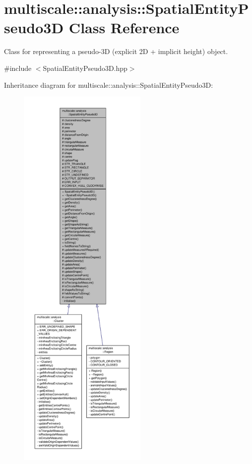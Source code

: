 \hypertarget{classmultiscale_1_1analysis_1_1SpatialEntityPseudo3D}{\section{multiscale\-:\-:analysis\-:\-:Spatial\-Entity\-Pseudo3\-D Class Reference}
\label{classmultiscale_1_1analysis_1_1SpatialEntityPseudo3D}
}


Class for representing a pseudo-\/3\-D (explicit 2\-D + implicit height) object.  




{\ttfamily \#include $<$Spatial\-Entity\-Pseudo3\-D.\-hpp$>$}



Inheritance diagram for multiscale\-:\-:analysis\-:\-:Spatial\-Entity\-Pseudo3\-D\-:
\nopagebreak
\begin{figure}[H]
\begin{center}
\leavevmode
\includegraphics[height=550pt]{classmultiscale_1_1analysis_1_1SpatialEntityPseudo3D__inherit__graph}
\end{center}
\end{figure}


